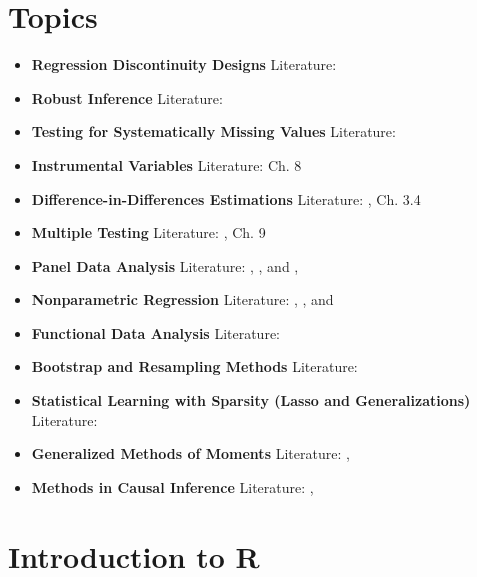 \documentclass[
]{book}
\begin{document}
\hypertarget{topics}{%
\chapter*{Topics}\label{topics}}

\begin{itemize}
\item
  \textbf{Regression Discontinuity Designs}
  Literature: \citet{IL2008}
\item
  \textbf{Robust Inference}
  Literature: \citet{RobInf2011}
\item
  \textbf{Testing for Systematically Missing Values}
  Literature: \citet{L1988}
\item
  \textbf{Instrumental Variables}
  Literature: \citet{DMcK2004} Ch. 8
\item
  \textbf{Difference-in-Differences Estimations}
  Literature: \citet{DID_2004}, \citet{cerulli2015} Ch. 3.4
\end{itemize}

\begin{itemize}
\item
  \textbf{Multiple Testing}
  Literature: \citet{BHW2010}, \citet{Lehmann2006} Ch. 9
\item
  \textbf{Panel Data Analysis}
  Literature: \citet{H2014}, \citet{G2003}, and \citet{B2008}, \citet{Wooldridge2010}
\item
  \textbf{Nonparametric Regression}
  Literature: \citet{LR2007}, \citet{FG1996}, and \citet{WJ1994}
\item
  \textbf{Functional Data Analysis}
  Literature: \citet{KR_FDA_2017}
\item
  \textbf{Bootstrap and Resampling Methods}
  Literature: \citet{DH_Bootstrap_1997}
\item
  \textbf{Statistical Learning with Sparsity (Lasso and Generalizations)}
  Literature: \citet{HTW2015}
\item
  \textbf{Generalized Methods of Moments}
  Literature: \citet{Hayashi2020}, \citet{Wooldridge2010}
\item
  \textbf{Methods in Causal Inference}
  Literature: \citet{CausalInf_Huber_2019}, \citet{cunningham2020causal}
\end{itemize}

\hypertarget{introduction-to-r}{%
\chapter{Introduction to R}\label{introduction-to-r}}
\end{document}
